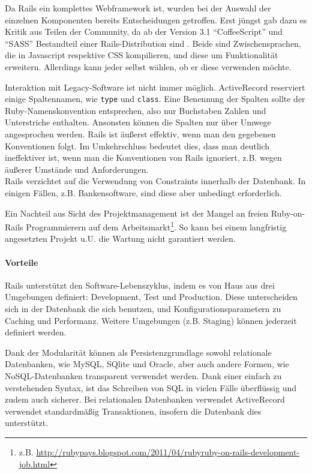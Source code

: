  Da Rails ein komplettes Webframework ist, wurden bei der Auswahl der einzelnen Komponenten bereits Entscheidungen getroffen.  Erst jüngst gab dazu es Kritik aus Teilen der Community, da ab der Version 3.1 "`CoffeeScript"' und "`SASS"' Bestandteil einer Rails-Distribution sind \citep{peter_cooper_rails_2011}. Beide sind Zwischensprachen, die in Javascript respektive CSS kompilieren, und diese um Funktionalität erweitern. Allerdings kann jeder selbst wählen, ob er diese verwenden möchte.


Interaktion mit Legacy-Software ist nicht immer möglich. ActiveRecord reserviert einige Spaltennamen, wie \texttt{type} und \texttt{class}. Eine Benennung der Spalten sollte der Ruby-Namenskonvention entsprechen, also nur Buchstaben Zahlen und Unterstriche enthalten. Ansonsten können die Spalten nur über Umwege angesprochen werden. Rails ist äußerst effektiv, wenn man den gegebenen Konventionen folgt. Im Umkehrschluss bedeutet dies, dass man deutlich ineffektiver ist, wenn man die Konventionen von Rails ignoriert, z.B. wegen äußerer Umstände und Anforderungen.\\
Rails verzichtet auf die Verwendung von Constraints innerhalb der Datenbank. In einigen Fällen, z.B. Bankensoftware, sind diese aber unbedingt erforderlich.

Ein Nachteil aus Sicht des Projektmanagement ist der Mangel an freien Ruby-on-Rails Programmierern auf dem Arbeitsmarkt\footnote{z.B. \url{http://rubypays.blogspot.com/2011/04/rubyruby-on-rails-development-job.html}}. So kann bei einem langfristig angesetzten Projekt u.U. die Wartung nicht garantiert werden.

\paragraph{Vorteile}
Rails unterstützt den Software-Lebenszyklus, indem es von Haus aus drei Umgebungen definiert: Development, Test und Production. Diese unterscheiden sich in der Datenbank die sich benutzen, und Konfigurationsparametern zu Caching und Performanz. Weitere Umgebungen (z.B. Staging) können jederzeit definiert werden.


Dank der Modularität können als Persistenzgrundlage sowohl relationale Datenbanken, wie MySQL, SQlite und Oracle, aber auch andere Formen, wie NoSQL-Datenbanken transparent verwendet werden. Dank einer einfach zu verstehenden Syntax, ist das Schreiben von SQL in vielen Fälle überflüssig und zudem auch sicherer. Bei relationalen Datenbanken verwendet ActiveRecord verwendet standardmäßig Transaktionen, insofern die Datenbank dies unterstützt.



